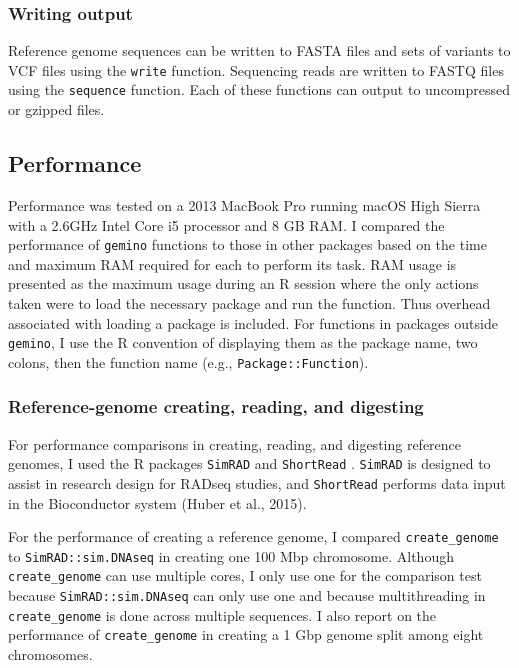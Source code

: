 \documentclass[12pt,]{article}
\begin{document}
\hypertarget{writing-output}{%
\subsubsection{Writing output}\label{writing-output}}

Reference genome sequences can be written to FASTA files and sets of
variants to VCF files using the \texttt{write} function. Sequencing
reads are written to FASTQ files using the \texttt{sequence} function.
Each of these functions can output to uncompressed or gzipped files.

\hypertarget{performance}{%
\subsection{Performance}\label{performance}}

Performance was tested on a 2013 MacBook Pro running macOS High Sierra
with a 2.6GHz Intel Core i5 processor and 8 GB RAM. I compared the
performance of \texttt{gemino} functions to those in other packages
based on the time and maximum RAM required for each to perform its task.
RAM usage is presented as the maximum usage during an R session where
the only actions taken were to load the necessary package and run the
function. Thus overhead associated with loading a package is included.
For functions in packages outside \texttt{gemino}, I use the R
convention of displaying them as the package name, two colons, then the
function name (e.g., \texttt{Package::Function}).

\hypertarget{reference-genome-creating-reading-and-digesting}{%
\subsubsection{Reference-genome creating, reading, and
digesting}\label{reference-genome-creating-reading-and-digesting}}

For performance comparisons in creating, reading, and digesting
reference genomes, I used the R packages \texttt{SimRAD} and
\texttt{ShortRead} . \texttt{SimRAD} is designed to assist in research
design for RADseq studies, and \texttt{ShortRead} performs data input in
the Bioconductor system (Huber et al., 2015).

For the performance of creating a reference genome, I compared
\texttt{create\_genome} to \texttt{SimRAD::sim.DNAseq} in creating one
100 Mbp chromosome. Although \texttt{create\_genome} can use multiple
cores, I only use one for the comparison test because
\texttt{SimRAD::sim.DNAseq} can only use one and because multithreading
in \texttt{create\_genome} is done across multiple sequences. I also
report on the performance of \texttt{create\_genome} in creating a 1 Gbp
genome split among eight chromosomes.
\end{document}
